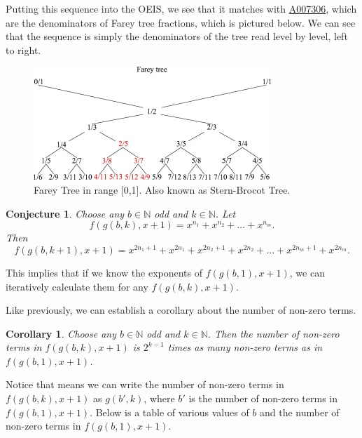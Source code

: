 \documentclass{article}
\newtheorem{corollary}{Corollary}
\newtheorem{conjecture}{Conjecture}
\newcommand{\N}{\mathbb{N}}
\begin{document}
	Putting this sequence into the OEIS, we see that it matches with \href{https://oeis.org/A007306}{A007306}, which are the denominators of Farey tree fractions, which is pictured below.
	We can see that the sequence is simply the denominators of the tree read level by level, left to right.
	
	\begin{figure}[H]
		\centering
		\includegraphics[width=0.8\textwidth]{farey_tree.jpg}
		\caption{Farey Tree in range [0,1]. Also known as Stern-Brocot Tree.}
	\end{figure}

	\begin{conjecture}
		Choose any $b \in \N$ odd and $k \in \N$.
		Let
		\begin{equation*}
			f(g(b,k),x+1) = x^{n_1} + x^{n_2} + \dots + x^{n_m}.
		\end{equation*}
		Then
		\begin{equation*}
			f(g(b,k+1),x+1) = x^{2n_1 + 1} + x^{2n_1} + x^{2n_2 + 1} + x^{2n_2} + \dots + x^{2n_m + 1} + x^{2n_m}.
		\end{equation*}
	\end{conjecture}
	This implies that if we know the exponents of $f(g(b,1),x+1)$, we can iteratively calculate them for any $f(g(b,k),x+1)$.
	
	Like previously, we can establish a corollary about the number of non-zero terms.
	\begin{corollary}
		Choose any $b \in \N$ odd and $k \in \N$.
		Then the number of non-zero terms in $f(g(b,k),x+1)$ is $2^{k-1}$ times as many non-zero terms as in $f(g(b,1),x+1)$.
	\end{corollary}
	Notice that means we can write the number of non-zero terms in $f(g(b,k),x+1)$ as $g(b',k)$, where $b'$ is the number of non-zero terms in $f(g(b,1),x+1)$.
	Below is a table of various values of $b$ and the number of non-zero terms in $f(g(b,1),x+1)$.
	
\end{document}

